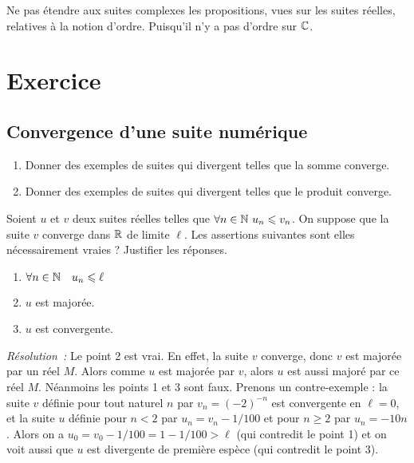 Ne pas étendre aux suites complexes les propositions, vues sur les suites réelles, relatives à la notion d'ordre. Puisqu'il n'y a pas d'ordre sur \(\mathbb{C}\).

\section{Exercice}
\subsection{Convergence d'une suite numérique}
\begin{exercice}
    \begin{enumerate}
        \item Donner des exemples de suites qui divergent telles que la somme converge.
        \item Donner des exemples de suites qui divergent telles que le produit converge.
    \end{enumerate}
\end{exercice}
\begin{exercice}
    Soient \(u\) et \(v\) deux suites réelles telles que \(\forall n \in \mathbb{N} \ u_n \leqslant v_n\). On suppose que la suite \(v\) converge dans \(\mathbb{R}\) de limite \(\ell\). Les assertions suivantes sont elles nécessairement vraies ? Justifier les réponses.
    \begin{enumerate}
        \item \(\forall n \in \mathbb{N} \quad u_n \leqslant \ell\)
        \item \(u\) est majorée.
        \item \(u\) est convergente.
    \end{enumerate}
\end{exercice}
\emph{Résolution~:}
Le point 2 est vrai. En effet, la suite \(v\) converge, donc \(v\) est majorée par un réel \(M\). Alors comme \(u\) est majorée par \(v\), alors \(u\) est aussi majoré par ce réel \(M\). Néanmoins les points 1 et 3 sont faux. Prenons un contre-exemple : la suite \(v\) définie pour tout naturel \(n\) par \(v_n = (-2)^{-n}\) est convergente en \(\ell = 0\), et la suite \(u\) définie pour \(n<2\) par \(u_n = v_n - 1/100\) et pour \(n\geqslant 2\) par \(u_n = -10n\). Alors on a \(u_0 = v_0 - 1/100 = 1 - 1/100 > \ell\) (qui contredit le point 1) et on voit aussi que \(u\) est divergente de première espèce (qui contredit le point 3).

